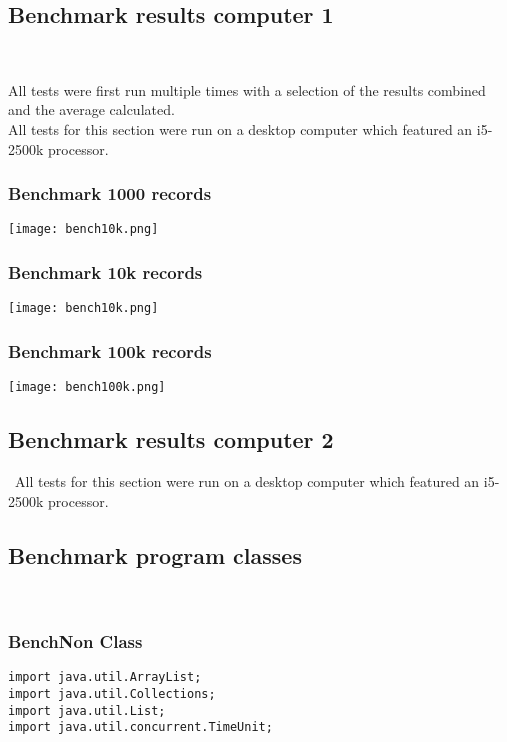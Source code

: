 \documentclass[11pt]{article}  %
\theoremstyle{definition}
\theoremstyle{remark}
\begin{document}
\newpage
\begin{appendices}

\subsection{Benchmark results computer 1}\

All tests were first run multiple times with a selection of the results combined and
the average calculated.\\

All tests for this section were run on a desktop computer which featured an i5-2500k processor.\\

\subsubsection{Benchmark 1000 records}\label{2} 
\texttt{[image: bench10k.png]}

\subsubsection{Benchmark 10k records}\label{2} 
\texttt{[image: bench10k.png]}

\subsubsection{Benchmark 100k records}\label{2} 
\texttt{[image: bench100k.png]}

\newpage
\subsection{Benchmark results computer 2}\
All tests for this section were run on a desktop computer which featured an i5-2500k processor.\\
\newpage
\subsection{Benchmark program classes}\

 
\subsubsection{BenchNon Class}\label{1} 
  \begin{lstlisting}
import java.util.ArrayList;
import java.util.Collections;
import java.util.List;
import java.util.concurrent.TimeUnit;


\end{lstlisting}
\end{appendices}
\end{document}
